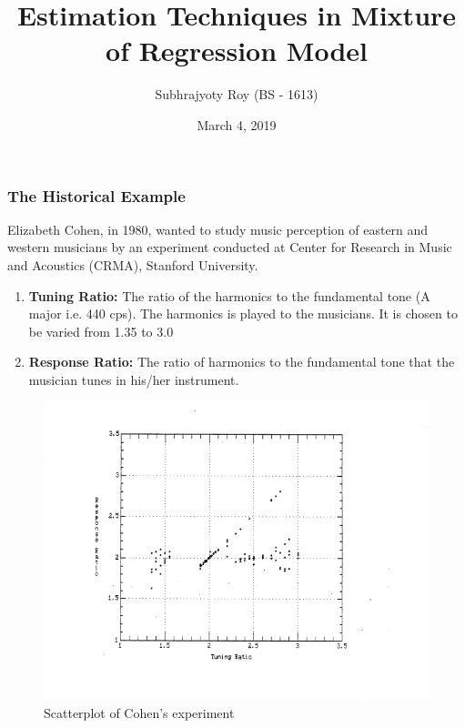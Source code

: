 \documentclass{beamer}
\title{Estimation Techniques in Mixture of Regression Model}
\author{Subhrajyoty Roy (BS - 1613)}
\date{March 4, 2019}
\begin{document}
	\begin{frame}
		\titlepage
	\end{frame}
	\begin{frame}
		\frametitle{The Historical Example}
		Elizabeth Cohen, in 1980, wanted to study music perception of eastern and western musicians by an experiment conducted at Center for Research in Music and Acoustics (CRMA), Stanford University.
		\begin{enumerate}
			\item \textbf{Tuning Ratio:} The ratio of the harmonics to the fundamental tone (A major i.e. 440 cps). The harmonics is played to the musicians. It is chosen to be varied from 1.35 to 3.0
			\item \textbf{Response Ratio:} The ratio of harmonics to the fundamental tone that the musician tunes in his/her instrument.
		\end{enumerate}
	\end{frame}
\begin{frame}
	\begin{figure}
	\caption{Scatterplot of Cohen's experiment}
	\includegraphics[width=\linewidth]{cohen.png}
	\end{figure}
\end{frame}
\end{document}
